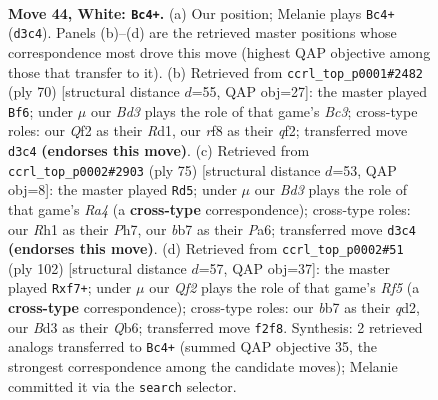 \documentclass[11pt]{article}
\begin{document}
\clearpage

\begin{figure}[p]\centering
\begin{subfigure}{0.46\textwidth}\centering
\resizebox{\linewidth}{!}{%
\newchessgame
\chessboard[
  setfen={5rk1/1b6/8/8/7p/3B3P/1p3QP1/6KR w - - 3 44},
  showmover=false,
  pgfstyle=straightmove, color=movearrow, markmove={d3-c4}
]}
\caption{}
\end{subfigure}\hfill
\begin{subfigure}{0.46\textwidth}\centering
\resizebox{\linewidth}{!}{%
\newchessgame
\chessboard[
  setfen={8/3b1p1k/7p/6r1/8/P1B2P2/5qPQ/3R3K w - - 4 36},
  showmover=false,
  pgfstyle=straightmove, color=movearrow, markmove={c3-f6}
]}
\caption{}
\end{subfigure}
\\[4pt]
\begin{subfigure}{0.46\textwidth}\centering
\resizebox{\linewidth}{!}{%
\newchessgame
\chessboard[
  setfen={5Q2/5p1p/p5p1/r6k/8/3P1qPP/6R1/7K b - - 2 38},
  showmover=false,
  pgfstyle=straightmove, color=movearrow, markmove={a5-d5}
]}
\caption{}
\end{subfigure}\hfill
\begin{subfigure}{0.46\textwidth}\centering
\resizebox{\linewidth}{!}{%
\newchessgame
\chessboard[
  setfen={8/1p3rk1/1Q6/5R2/7p/7P/3q2PK/8 w - - 1 52},
  showmover=false,
  pgfstyle=straightmove, color=movearrow, markmove={f5-f7}
]}
\caption{}
\end{subfigure}
\caption{\textbf{Move 44, White: \texttt{Bc4+}.} (a) Our position; Melanie plays \texttt{Bc4+} (\texttt{d3c4}). Panels (b)--(d) are the retrieved master positions whose correspondence most drove this move (highest QAP objective among those that transfer to it). (b) Retrieved from \texttt{ccrl\_top\_p0001\#2482} (ply 70) [structural distance $d$=55, QAP obj=27]: the master played \texttt{Bf6}; under $\mu$ our \emph{Bd3} plays the role of that game's \emph{Bc3}; cross-type roles: our \emph{Q}f2 as their \emph{R}d1, our \emph{r}f8 as their \emph{q}f2; transferred move \texttt{d3c4} \textbf{(endorses this move)}. (c) Retrieved from \texttt{ccrl\_top\_p0002\#2903} (ply 75) [structural distance $d$=53, QAP obj=8]: the master played \texttt{Rd5}; under $\mu$ our \emph{Bd3} plays the role of that game's \emph{Ra4} (a \textbf{cross-type} correspondence); cross-type roles: our \emph{R}h1 as their \emph{P}h7, our \emph{b}b7 as their \emph{P}a6; transferred move \texttt{d3c4} \textbf{(endorses this move)}. (d) Retrieved from \texttt{ccrl\_top\_p0002\#51} (ply 102) [structural distance $d$=57, QAP obj=37]: the master played \texttt{Rxf7+}; under $\mu$ our \emph{Qf2} plays the role of that game's \emph{Rf5} (a \textbf{cross-type} correspondence); cross-type roles: our \emph{b}b7 as their \emph{q}d2, our \emph{B}d3 as their \emph{Q}b6; transferred move \texttt{f2f8}. Synthesis: 2 retrieved analogs transferred to \texttt{Bc4+} (summed QAP objective 35, the strongest correspondence among the candidate moves); Melanie committed it via the \texttt{search} selector.}
\label{fig:thought-m86}
\end{figure}
\end{document}
